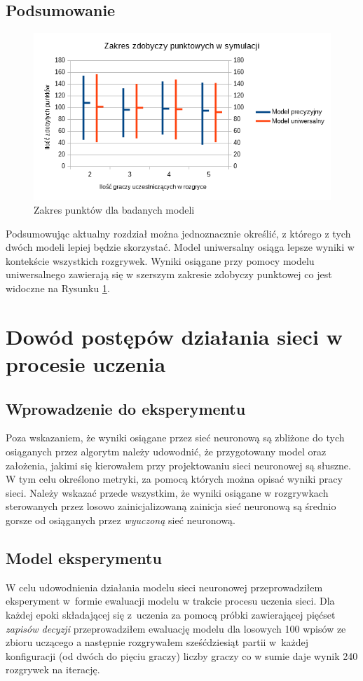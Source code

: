 \documentclass[12pt, oneside]{report}
\begin{document}
	\section{Podsumowanie}
	\begin{figure}[h]
		\includegraphics[width=\linewidth]{ZakresPunktow.png}
		\caption{Zakres punktów dla badanych modeli}
		\label{figure:points_range}
	\end{figure}
	Podsumowując aktualny rozdział można jednoznacznie określić, z którego z tych dwóch modeli lepiej będzie skorzystać. Model uniwersalny osiąga lepsze wyniki w kontekście wszystkich rozgrywek. Wyniki osiągane przy pomocy modelu uniwersalnego zawierają się w szerszym zakresie zdobyczy punktowej co jest widoczne na Rysunku \ref{figure:points_range}.
	
	\chapter{Dowód postępów działania sieci w procesie uczenia}
	\section{Wprowadzenie do eksperymentu}
	Poza wskazaniem, że wyniki osiągane przez sieć neuronową są zbliżone do tych osiąganych przez algorytm należy udowodnić, że przygotowany model oraz założenia, jakimi się kierowałem przy projektowaniu sieci neuronowej są słuszne. W tym celu określono metryki, za pomocą których można opisać wyniki pracy sieci. Należy wskazać przede wszystkim, że wyniki osiągane w rozgrywkach sterowanych przez losowo zainicjalizowaną zainicja sieć neuronową są średnio gorsze od osiąganych przez \textit{wyuczoną} sieć neuronową.
	\section{Model eksperymentu}
	W celu udowodnienia działania modelu sieci neuronowej przeprowadziłem eksperyment w~formie ewaluacji modelu w trakcie procesu uczenia sieci. Dla każdej epoki składającej się z~uczenia za pomocą próbki zawierającej pięćset \textit{zapisów decyzji} przeprowadziłem ewaluację modelu dla losowych 100 wpisów ze zbioru uczącego a następnie rozgrywałem sześćdziesiąt partii w~każdej konfiguracji (od dwóch do pięciu graczy) liczby graczy co w sumie daje wynik 240 rozgrywek na iterację.
\end{document}

